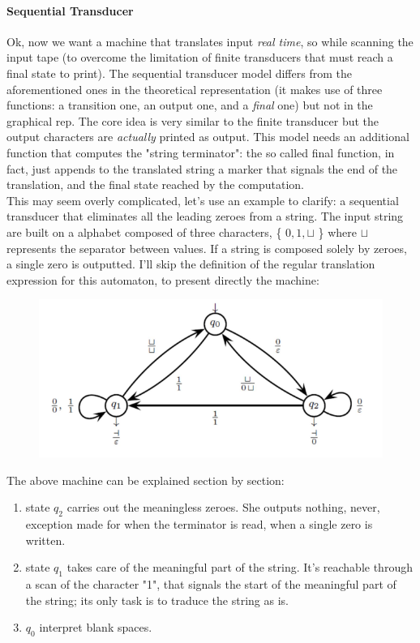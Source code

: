 				\paragraph{Sequential Transducer}
					Ok, now we want a machine that translates input \emph{real time}, so while scanning the input tape (to overcome the limitation of finite transducers that must reach a final state to print). The sequential transducer model differs from the aforementioned ones in the theoretical representation (it makes use of three functions: a transition one, an output one, and a \emph{final} one) but not in the graphical rep. The core idea is very similar to the finite transducer but the output characters are \emph{actually} printed as output. This model needs an additional function that computes the "string terminator": the so called final function, in fact, just appends to the translated string a marker that signals the end of the translation, and the final state reached by the computation.\\
					This may seem overly complicated, let's use an example to clarify: a sequential transducer that eliminates all the leading zeroes from a string. The input string are built on a alphabet composed of three characters, \{ $0, 1, \sqcup$ \} where $\sqcup$ represents the separator between values. If a string is composed solely by zeroes, a single zero is outputted.
					I'll skip the definition of the regular translation expression for this automaton, to present directly the machine:
					\begin{figure}[H]
						\centering
						\includegraphics[width = \textwidth]{./images/SeqTrans.png}
					\end{figure}
					The above machine can be explained section by section:
					\begin{enumerate}
						\item state $q_2$ carries out the meaningless zeroes. She outputs nothing, never, exception made for when the terminator is read, when a single zero is written. 
						\item state $q_1$ takes care of the meaningful part of the string. It's reachable through a scan of the character "1", that signals the start of the meaningful part of the string; its only task is to traduce the string as is.
						\item $q_0$ interpret blank spaces. 
					\end{enumerate}
					
